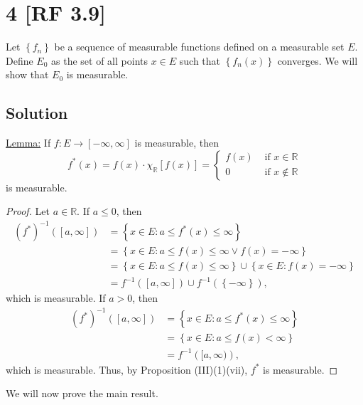 \documentclass[12pt]{article}
\begin{document}
\newpage
\section*{4 [RF 3.9]}
Let $\left\{ f_{n} \right\}$ be a sequence of measurable functions defined on a measurable set $E$. Define $E_{0}$ as the set of all points $x \in E$
such that $\left\{ f_{n}(x) \right\}$ converges. We will show that $E_{0}$ is measurable.

\subsection*{Solution}
\underline{Lemma:} If $f : E \rightarrow [-\infty, \infty]$ is measurable, then 
\[ f^{*}(x) = f(x) \cdot \chi_{\mathbb{R}}[f(x)] = \left\{ \begin{array}{cl}
f(x) & \text{ if } x \in \mathbb{R} \\
0 & \text{ if } x \notin \mathbb{R} 
\end{array} \right. \]
is measurable.

\begin{proof}
Let $a \in \mathbb{R}$. If $a \leq 0$, then 
\begin{align*}
(f^{*})^{-1}\left( [a,\infty] \right) & = \left\{ x \in E : a \leq f^{*}(x) \leq \infty \right\} \\
& = \left\{ x \in E : a \leq f(x) \leq \infty \vee f(x) = -\infty \right\} \\
& = \left\{ x \in E : a \leq f(x) \leq \infty \right\} \cup \left\{ x \in E : f(x) = -\infty \right\} \\
& = f^{-1}\left( [a,\infty] \right) \cup f^{-1}(\left\{ -\infty \right\}),
\end{align*}
which is measurable. If $a > 0$, then 
\begin{align*}
(f^{*})^{-1}\left( [a,\infty] \right) & = \left\{ x \in E : a \leq f^{*}(x) \leq \infty \right\} \\
& = \left\{ x \in E : a \leq f(x) < \infty \right\} \\
& = f^{-1}\left( [a,\infty) \right),
\end{align*}
which is measurable. Thus, by Proposition (III)(1)(vii), $f^{*}$ is measurable.
\end{proof}

We will now prove the main result.
\end{document}
